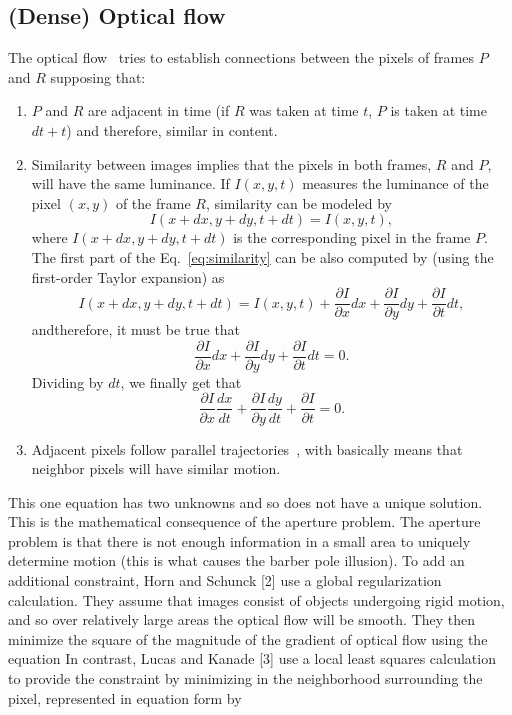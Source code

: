 \subsection{(Dense) Optical flow}
The optical flow~\cite{horn1981determining} tries to establish connections between the pixels of
frames $P$ and $R$ supposing that:
\begin{enumerate}
\item $P$ and $R$ are adjacent in time (if $R$ was taken at time $t$,
  $P$ is taken at time $dt+t$) and therefore, similar in
  content.
\item Similarity between images implies that the pixels in both
  frames, $R$ and $P$, will have the same luminance. If $I(x,y,t)$
  measures the luminance of the pixel $(x,y)$ of the frame $R$,
  similarity can be modeled by
  \begin{equation}
    I(x+dx, y+dy, t+dt) = I(x,y,t),
    \label{eq:similarity}
  \end{equation}
  where $I(x+dx, y+dy, t+dt)$ is the corresponding pixel in the frame
  $P$. The first part of the Eq.~\ref{eq:similarity} can be also
  computed by (using the first-order Taylor expansion) as
  \begin{equation}
    I(x+dx, y+dy, t+dt) = I(x,y,t) + \frac{\partial I}{\partial x}dx + \frac{\partial I}{\partial y}dy + \frac{\partial I}{\partial t}dt,
    \label{eq:taylor_exp}
  \end{equation}
  andtherefore, it must be true that
  \begin{equation}
    \frac{\partial I}{\partial x}dx + \frac{\partial I}{\partial y}dy + \frac{\partial I}{\partial t}dt = 0.
    \label{eq:constraint}
  \end{equation}
  Dividing by $dt$, we finally get that
  \begin{equation}
    \frac{\partial I}{\partial x}\frac{dx}{dt} + \frac{\partial I}{\partial y}\frac{dy}{dt} + \frac{\partial I}{\partial t} = 0.
  \end{equation}
\item Adjacent pixels follow parallel
  trajectories~\cite{horn1981determining}, with basically means that
  neighbor pixels will have similar motion.
\end{enumerate}

This one equation has two unknowns and so does not have a unique solution. This is the mathematical consequence of the aperture problem. The aperture problem is that there is not enough information in a small area to uniquely determine motion (this is what causes the barber pole illusion). To add an additional constraint, Horn and Schunck [2] use a global regularization calculation. They assume that images consist of objects undergoing rigid motion, and so over relatively large areas the optical flow will be smooth. They then minimize the square of the magnitude of the gradient of optical flow using the equation
%
%
%
In contrast, Lucas and Kanade [3] use a local least squares calculation to provide the constraint by minimizing in the neighborhood surrounding the pixel, represented in equation form by
%
%
%


